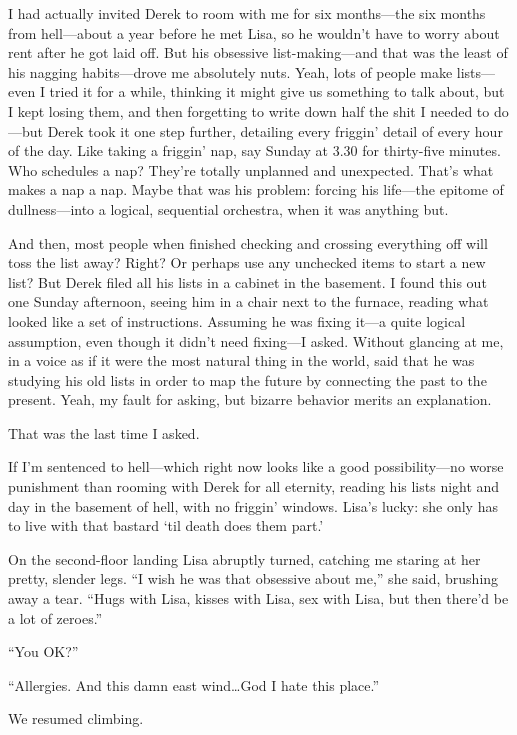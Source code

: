 I had actually invited Derek to room with me for six months---the six
months from hell---about a year before he met Lisa, so he wouldn't have
to worry about rent after he got laid off. But his obsessive
list-making---and that was the least of his nagging habits---drove me
absolutely nuts. Yeah, lots of people make lists---even I tried it for a
while, thinking it might give us something to talk about, but I kept
losing them, and then forgetting to write down half the shit I needed to
do---but Derek took it one step further, detailing every friggin' detail
of every hour of the day. Like taking a friggin' nap, say Sunday at 3.30
for thirty-five minutes. Who schedules a nap? They're totally unplanned
and unexpected. That's what makes a nap a nap. Maybe that was his
problem: forcing his life---the epitome of dullness---into a logical,
sequential orchestra, when it was anything but.

And then, most people when finished checking and crossing everything off
will toss the list away? Right? Or perhaps use any unchecked items to
start a new list? But Derek filed all his lists in a cabinet in the
basement. I found this out one Sunday afternoon, seeing him in a chair
next to the furnace, reading what looked like a set of instructions.
Assuming he was fixing it---a quite logical assumption, even though it
didn't need fixing---I asked. Without glancing at me, in a voice as if
it were the most natural thing in the world, said that he was studying
his old lists in order to map the future by connecting the past to the
present. Yeah, my fault for asking, but bizarre behavior merits an
explanation.

That was the last time I asked.

If I'm sentenced to hell---which right now looks like a good
pos\-si\-bil\-i\-ty---no worse punishment than rooming with Derek for all
eternity, reading his lists night and day in the basement of hell, with
no friggin' windows. Lisa's lucky: she only has to live with that
bastard `til death does them part.'

On the second-floor landing Lisa abruptly turned, catching me staring at
her pretty, slender legs. ``I wish he was that obsessive about me,'' she
said, brushing away a tear. ``Hugs with Lisa, kisses with Lisa, sex with
Lisa, but then there'd be a lot of zeroes.''

``You OK?''

``Allergies. And this damn east wind\ldots God I hate this place.''

We resumed climbing.

